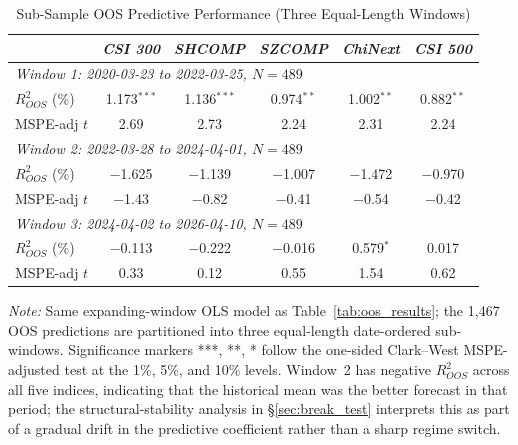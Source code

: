 \documentclass[AER]{AEA}
\begin{document}
\begin{table}[h!]
    \centering
    \caption{Sub-Sample OOS Predictive Performance (Three Equal-Length Windows)}
    \label{tab:oos_subsample}
    \setlength{\tabcolsep}{4pt}
    \footnotesize
    \begin{tabular}{lccccc}
    \toprule
    & \textit{CSI 300} & \textit{SHCOMP} & \textit{SZCOMP} & \textit{ChiNext} & \textit{CSI 500} \\
    \midrule
    \multicolumn{6}{l}{\textit{Window 1: 2020-03-23 to 2022-03-25, $N=489$}} \\
    \midrule
    $R^2_{OOS}$ (\%)        & 1.173$^{***}$ & 1.136$^{***}$ & 0.974$^{**}$  & 1.002$^{**}$  & 0.882$^{**}$  \\
    MSPE-adj $t$            & 2.69          & 2.73          & 2.24          & 2.31          & 2.24          \\
    \midrule
    \multicolumn{6}{l}{\textit{Window 2: 2022-03-28 to 2024-04-01, $N=489$}} \\
    \midrule
    $R^2_{OOS}$ (\%)        & $-$1.625      & $-$1.139      & $-$1.007      & $-$1.472      & $-$0.970      \\
    MSPE-adj $t$            & $-$1.43       & $-$0.82       & $-$0.41       & $-$0.54       & $-$0.42       \\
    \midrule
    \multicolumn{6}{l}{\textit{Window 3: 2024-04-02 to 2026-04-10, $N=489$}} \\
    \midrule
    $R^2_{OOS}$ (\%)        & $-$0.113      & $-$0.222      & $-$0.016      & 0.579$^{*}$   & 0.017         \\
    MSPE-adj $t$            & 0.33          & 0.12          & 0.55          & 1.54          & 0.62          \\
    \bottomrule
    \end{tabular}

    \vspace{0.2cm}
    \footnotesize
    \textit{Note:} Same expanding-window OLS model as Table~\ref{tab:oos_results}; the 1{,}467 OOS predictions are partitioned into three equal-length date-ordered sub-windows. Significance markers ***, **, * follow the one-sided Clark--West MSPE-adjusted test at the 1\%, 5\%, and 10\% levels. Window~2 has negative $R^2_{OOS}$ across all five indices, indicating that the historical mean was the better forecast in that period; the structural-stability analysis in \S\ref{sec:break_test} interprets this as part of a gradual drift in the predictive coefficient rather than a sharp regime switch.
\end{table}
\end{document}

